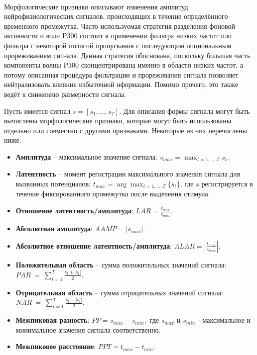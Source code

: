 \documentclass[12pt,a4paper,oneside,fleqn,leqno]{article}
\newcounter{pe} %
\newcommand*{\Nep}{\addtocounter{pe}{1}{\arabic{pe}$^{\circ}$.\;}}
\newcommand*{\NepS}{\mbox{} \\ \Nep}
\begin{document}
	\NepS {\bf Морфологические признаки}
	\par Морфологические признаки описывают изменения амплитуд нейрофизиологических сигналов, происходящих в течение определённого временного промежутка. Часто используемая стратегия разделения фоновой активности и волн P300 состоит в применении фильтра низких частот или фильтра с некоторой полосой пропускания с последующим опциональным прореживанием сигнала. Данная стратегия обоснована, поскольку большая часть компоненты волны P300 сконцентрирована именно в области низких частот, а потому описанная процедура фильтрации и прореживания сигнала позволяет нейтрализовать влияние избыточной нформации. Помимо прочего, это также ведёт к снижению размерности сигнала.
	\par Пусть имеется сигнал $s = [s_1, \dots, s_T].$ Для описания формы сигнала могут быть вычислены морфологические признаки, которые могут быть использованы отдельно или совместно с другими признаками. Некоторые из них перечислены ниже.
	\begin{itemize}
	\item 
	{\bf Амплитуда} -- максимальное значение сигнала: $\displaystyle s_{max} = \max_{t = 1, \dots, T} {s_t}$.
	\item
	{\bf Латентность} -- момент регистрации максимального значения сигнала для вызванных потенциалов: $\displaystyle t_{max} = \arg \max_{t=1, \dots, T} \{ s_t \}$, где $s$ регистрируется в течение фиксированного промежутка после выделения стимула.
	\item
	{\bf Отношение латентность/амплитуда}: $\displaystyle LAR = \frac{t_{max}}{s_{max}}$.
	\item
	{\bf Абсолютная амплитуда}: $\displaystyle AAMP = \left| s_{max} \right|$.
	\item
	{\bf Абсолютное отношение латентность/амплитуда}: $\displaystyle ALAR = \left| \frac{t_{max}}{s_{max}} \right|$.
	\item
	{\bf Положительная область} -- сумма положительных значений сигнала: \\ $\displaystyle PAR~=~\sum_{t = 1} ^ T \frac{s_t + |s_t|}{2}.$
	\item
	{\bf Отрицательная область} -- сумма отрицательных значений сигнала: \\$\displaystyle NAR~=~\sum_{t = 1} ^ T \frac{s_t - |s_t|}{2}.$
	\item
	{\bf Межпиковая разность}: $\displaystyle PP = s_{max} - s_{min},$ где $s_{max}$ и $s_{min}$ - максимальное и минимальное значения сигнала соответственно.
	\item
	{\bf Межпиковое расстояние}: $\displaystyle PPT = t_{max} - t_{min}.$
	\end{itemize}
\end{document}
